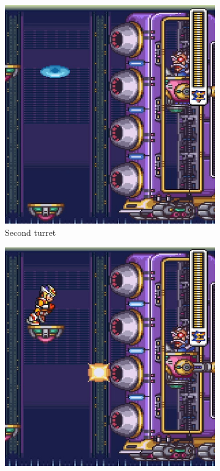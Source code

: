 \begin{figure}[htp]
\begin{subfigure}{0.32\linewidth}
		\includegraphics[width=\linewidth]{figures/X2/Hunter_stages/Serges_tank_2.png}
		\caption{Second turret}
	\end{subfigure}
	\begin{subfigure}{.32\linewidth}
		\centering
		\includegraphics[width=\linewidth]{figures/X2/Hunter_stages/Serges_tank_3.png}

\end{subfigure}
\end{figure}
